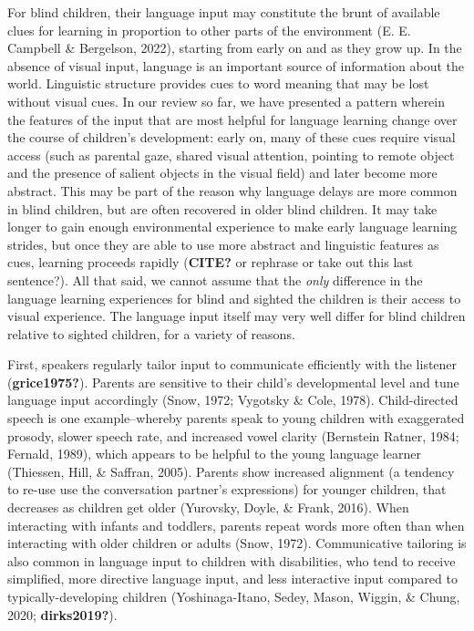 \documentclass[
  man]{apa6}
\begin{document}
For blind children, their language input may constitute the brunt of available clues for learning in proportion to other parts of the environment (E. E. Campbell \& Bergelson, 2022), starting from early on and as they grow up. In the absence of visual input, language is an important source of information about the world. Linguistic structure provides cues to word meaning that may be lost without visual cues. In our review so far, we have presented a pattern wherein the features of the input that are most helpful for language learning change over the course of children's development: early on, many of these cues require visual access (such as parental gaze, shared visual attention, pointing to remote object and the presence of salient objects in the visual field) and later become more abstract. This may be part of the reason why language delays are more common in blind children, but are often recovered in older blind children. It may take longer to gain enough environmental experience to make early language learning strides, but once they are able to use more abstract and linguistic features as cues, learning proceeds rapidly (\textbf{CITE?} or rephrase or take out this last sentence?). All that said, we cannot assume that the \emph{only} difference in the language learning experiences for blind and sighted the children is their access to visual experience. The language input itself may very well differ for blind children relative to sighted children, for a variety of reasons.

First, speakers regularly tailor input to communicate efficiently with the listener (\textbf{grice1975?}). Parents are sensitive to their child's developmental level and tune language input accordingly (Snow, 1972; Vygotsky \& Cole, 1978). Child-directed speech is one example--whereby parents speak to young children with exaggerated prosody, slower speech rate, and increased vowel clarity (Bernstein Ratner, 1984; Fernald, 1989), which appears to be helpful to the young language learner (Thiessen, Hill, \& Saffran, 2005). Parents show increased alignment (a tendency to re-use use the conversation partner's expressions) for younger children, that decreases as children get older (Yurovsky, Doyle, \& Frank, 2016). When interacting with infants and toddlers, parents repeat words more often than when interacting with older children or adults (Snow, 1972). Communicative tailoring is also common in language input to children with disabilities, who tend to receive simplified, more directive language input, and less interactive input compared to typically-developing children (Yoshinaga-Itano, Sedey, Mason, Wiggin, \& Chung, 2020; \textbf{dirks2019?}).
\end{document}

